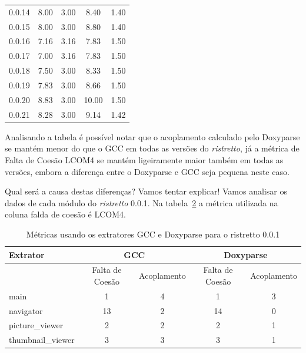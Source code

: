 \begin{table}
\begin{tabular}{| l | c c | c c |}
0.0.14    & 8.00            & 3.00           & 8.40            & 1.40          \\
0.0.15    & 8.00            & 3.00           & 8.80            & 1.40          \\
0.0.16    & 7.16            & 3.16           & 7.83            & 1.50          \\
0.0.17    & 7.00            & 3.16           & 7.83            & 1.50          \\
0.0.18    & 7.50            & 3.00           & 8.33            & 1.50          \\
0.0.19    & 7.83            & 3.00           & 8.66            & 1.50          \\
0.0.20    & 8.83            & 3.00           & 10.00           & 1.50          \\
0.0.21    & 8.28            & 3.00           & 9.14            & 1.42          \\
\hline
\end{tabular}
\label{tab:comparacao-metricas}
\end{table}

Analisando a tabela é possível notar que o acoplamento calculado pelo Doxyparse
se mantém menor do que o GCC em todas as versões do {\it ristretto}, já a métrica de
Falta de Coesão LCOM4 se mantém ligeiramente maior também em todas as versões,
embora a diferença entre o Doxyparse e GCC seja pequena neste caso.

Qual será a causa destas diferenças? Vamos tentar explicar! Vamos analisar os
dados de cada módulo do {\it ristretto} 0.0.1. Na
tabela~\ref{tab:comparacao-metricas-ristretto-0.0.1} a métrica utilizada na
coluna falda de coesão é LCOM4.

\begin{table}
\caption{Métricas usando os extratores GCC e Doxyparse para o ristretto 0.0.1}
\centering
\begin{tabular}{| l | c c | c c |}
\hline
Extrator          & \multicolumn{2}{|c|}{GCC}        & \multicolumn{2}{|c|}{Doxyparse} \\
\hline
                  & Falta de Coesão & Acoplamento    & Falta de Coesão & Acoplamento   \\
\hline
main              & 1               & 4              & 1               & 3             \\
navigator         & 13              & 2              & 14              & 0             \\
picture\_viewer   & 2               & 2              & 2               & 1             \\
thumbnail\_viewer & 3               & 3              & 3               & 1             \\
\hline
\end{tabular}
\label{tab:comparacao-metricas-ristretto-0.0.1}
\end{table}

